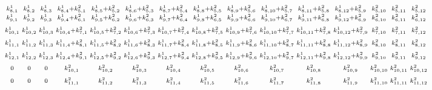 \begin{landscape}
\begin{equation}
\begin{array}{l}
\begin{smallmatrix}
k^{1}_{8,1} & k^{1}_{8,2} & k^{1}_{8,3} & k^{1}_{8,4} + k^{2}_{5,1} & k^{1}_{8,5} + k^{2}_{5,2} & k^{1}_{8,6} + k^{2}_{5,3} & k^{1}_{8,7} + k^{2}_{5,4} & k^{1}_{8,8} + k^{2}_{5,5} & k^{1}_{8,9} + k^{2}_{5,6} & k^{1}_{8,10} + k^{2}_{5,7} & k^{1}_{8,11} + k^{2}_{5,8} & k^{1}_{8,12} + k^{2}_{5,9} & k^{2}_{5,10} & k^{2}_{5,11} & k^{2}_{5,12} \\ \vspace*{1.0ex}
k^{1}_{9,1} & k^{1}_{9,2} & k^{1}_{9,3} & k^{1}_{9,4} + k^{2}_{6,1} & k^{1}_{9,5} + k^{2}_{6,2} & k^{1}_{9,6} + k^{2}_{6,3} & k^{1}_{9,7} + k^{2}_{6,4} & k^{1}_{9,8} + k^{2}_{6,5} & k^{1}_{9,9} + k^{2}_{6,6} & k^{1}_{9,10} + k^{2}_{6,7} & k^{1}_{9,11} + k^{2}_{6,8} & k^{1}_{9,12} + k^{2}_{6,9} & k^{2}_{6,10} & k^{2}_{6,11} & k^{2}_{6,12} \\ \vspace*{1.0ex}
k^{1}_{10,1} & k^{1}_{10,2} & k^{1}_{10,3} & k^{1}_{10,4} + k^{2}_{7,1} & k^{1}_{10,5} + k^{2}_{7,2} & k^{1}_{10,6} + k^{2}_{7,3} & k^{1}_{10,7} + k^{2}_{7,4} & k^{1}_{10,8} + k^{2}_{7,5} & k^{1}_{10,9} + k^{2}_{7,6} & k^{1}_{10,10} + k^{2}_{7,7} & k^{1}_{10,11} + k^{2}_{7,8} & k^{1}_{10,12} + k^{2}_{7,9} & k^{2}_{7,10} & k^{2}_{7,11} & k^{2}_{7,12} \\ \vspace*{1.0ex}
k^{1}_{11,1} & k^{1}_{11,2} & k^{1}_{11,3} & k^{1}_{11,4} + k^{2}_{8,1} & k^{1}_{11,5} + k^{2}_{8,2} & k^{1}_{11,6} + k^{2}_{8,3} & k^{1}_{11,7} + k^{2}_{8,4} & k^{1}_{11,8} + k^{2}_{8,5} & k^{1}_{11,9} + k^{2}_{8,6} & k^{1}_{11,10} + k^{2}_{8,7} & k^{1}_{11,11} + k^{2}_{8,8} & k^{1}_{11,12} + k^{2}_{8,9} & k^{2}_{8,10} & k^{2}_{8,11} & k^{2}_{8,12} \\ \vspace*{1.0ex}
k^{1}_{12,1} & k^{1}_{12,2} & k^{1}_{12,3} & k^{1}_{12,4} + k^{2}_{9,1} & k^{1}_{12,5} + k^{2}_{9,2} & k^{1}_{12,6} + k^{2}_{9,3} & k^{1}_{12,7} + k^{2}_{9,4} & k^{1}_{12,8} + k^{2}_{9,5} & k^{1}_{12,9} + k^{2}_{9,6} & k^{1}_{12,10} + k^{2}_{9,7} & k^{1}_{12,11} + k^{2}_{9,8} & k^{1}_{12,12} + k^{2}_{9,9} & k^{2}_{9,10} & k^{2}_{9,11} & k^{2}_{9,12} \\ \vspace*{1.0ex}
0 & 0 & 0 & k^{2}_{10,1} & k^{2}_{10,2} & k^{2}_{10,3} & k^{2}_{10,4} & k^{2}_{10,5} & k^{2}_{10,6} & k^{2}_{10,7} & k^{2}_{10,8} & k^{2}_{10,9} & k^{2}_{10,10} & k^{2}_{10,11} & k^{2}_{10,12} \\ \vspace*{1.0ex}
0 & 0 & 0 & k^{2}_{11,1} & k^{2}_{11,2} & k^{2}_{11,3} & k^{2}_{11,4} & k^{2}_{11,5} & k^{2}_{11,6} & k^{2}_{11,7} & k^{2}_{11,8} & k^{2}_{11,9} & k^{2}_{11,10} & k^{2}_{11,11} & k^{2}_{11,12} \\ \vspace*{1.0ex}

\end{smallmatrix}
\end{array}
\end{equation}
\end{landscape}
